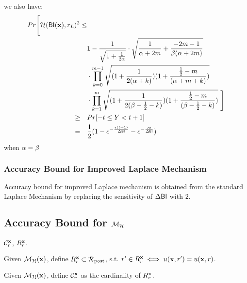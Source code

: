 \documentclass{article}
\begin{document}
\begin{itemize}
  we also have: 
  \begin{align*}
   Pr\Bigg[ \mathcal{H}(\mathsf{BI}(\textbf{x}), r_L )^2 \leq & \\
  \qquad &
  1 - \frac{1}{\sqrt{1 + \frac{1}{2\alpha}}} \cdot 
  \sqrt{\frac{1}{\alpha + 2m} + \frac{- 2m - 1}{\beta(\alpha + 2m)}} \\
  \qquad &\cdot 
  \prod_{k = 0}^{m-1}
  \sqrt{(1 + \frac{1}{2(\alpha + k)})
  (1 + \frac{\frac{1}{2} - m}{(\alpha + m  + k)})
  } \\
  \qquad & \cdot 
  \prod_{k = 1}^{m} 
  \sqrt{(1 + \frac{1}{2(\beta - \frac{1}{2}- k)})(1 + \frac{\frac{1}{2} - m}{(\beta - \frac{1}{2}- k)})}\ \Bigg] \\
  \geq \quad & Pr[ - t \leq Y < t + 1] \\
  = \quad & \frac{1}{2} (1 - e^{- \frac{\epsilon (t + 1)}{\Delta \mathsf{BI}}}- e^{- \frac{\epsilon t}{\Delta \mathsf{BI}}})
  \end{align*}
  when $\alpha = \beta$

\end{itemize} 

\subsubsection{Accuracy Bound for Improved Laplace Mechanism}
\label{subsec_accuracy_lap}
Accuracy bound for improved Laplace mechanism is obtained from the standard Laplace Mechanism by replacing the sensitivity of $\Delta \mathsf{BI}$ with $2$.



\subsection{Accuracy Bound for $\mathcal{M}_{\mathcal{H}}$}
\label{subsec_accuracy_smoo}

\begin{definition}
\label{def_cardinality}
  $\mathcal{C}^{\textbf{x}}_{r}$, $R^{\textbf{x}}_r$.

  Given $\mathcal{M}_{\mathcal{H}}(\textbf{x})$, define $R^{\textbf{x}}_r \subset \mathcal{R}_{\textup{post}}$, s.t. $r' \in R^{\textbf{x}}_r \iff u(\textbf{x}, {r'}) = u(\textbf{x}, {r})$.

  Given $\mathcal{M}_{\mathcal{H}}(\textbf{x})$, define $\mathcal{C}^{\textbf{x}}_{r}$ as the cardinality of $R^{\textbf{x}}_r$. 
\end{definition}
\end{document}
